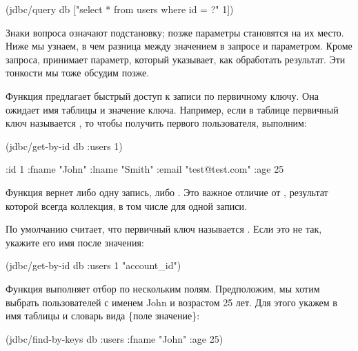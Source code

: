 \begin{english}
  \begin{clojure}
(jdbc/query db
            ["select * from users where id = ?" 1])
  \end{clojure}
\end{english}

Знаки вопроса означают подстановку; позже параметры становятся на их место. Ниже мы узнаем, в чем разница между значением в запросе и параметром. Кроме запроса,  принимает параметр, который указывает, как обработать результат. Эти тонкости мы тоже обсудим позже.

Функция  предлагает быстрый доступ к записи по первичному ключу. Она ожидает имя таблицы и значение ключа. Например, если в таблице  первичный ключ называется , то чтобы получить первого пользователя, выполним:

\begin{english}
  \begin{clojure}
(jdbc/get-by-id db :users 1)

{:id 1 :fname "John" :lname "Smith"
 :email "test@test.com" :age 25}
  \end{clojure}
\end{english}

Функция вернет либо одну запись, либо . Это важное отличие от , результат которой всегда коллекция, в том числе для одной записи.

По умолчанию  считает, что первичный ключ называется . Если это не так, укажите  его имя после значения:

\begin{english}
  \begin{clojure}
(jdbc/get-by-id db :users 1 "account_id")
  \end{clojure}
\end{english}

Функция  выполняет отбор по нескольким полям. Предположим, мы хотим выбрать пользователей с именем John и возрастом 25 лет. Для этого укажем в  имя таблицы и словарь вида \{поле \arr значение\}:

\begin{english}
  \begin{clojure}
(jdbc/find-by-keys db :users {:fname "John" :age 25})
  \end{clojure}
\end{english}


